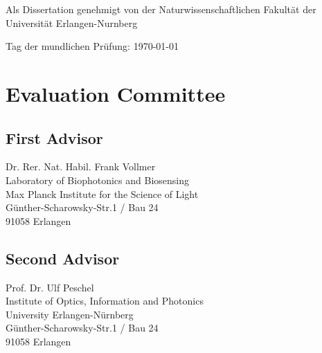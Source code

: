 Als Dissertation genehmigt von der Naturwissenschaftlichen Fakultät der
Universität Erlangen-Nurnberg\\
\vspace{0.5cm}

Tag der mundlichen Prüfung: \today\\
\vspace{0.5cm}

\section*{Evaluation Committee}
\subsection*{First Advisor}
Dr. Rer. Nat. Habil. Frank Vollmer\\
Laboratory of Biophotonics and Biosensing\\
Max Planck Institute for the Science of Light\\
G\"unther-Scharowsky-Str.1 / Bau 24\\
91058 Erlangen
\subsection*{Second Advisor}
Prof. Dr. Ulf Peschel\\
Institute of Optics, Information and Photonics\\
University Erlangen-N\"urnberg\\
G\"unther-Scharowsky-Str.1 / Bau 24\\
91058 Erlangen


